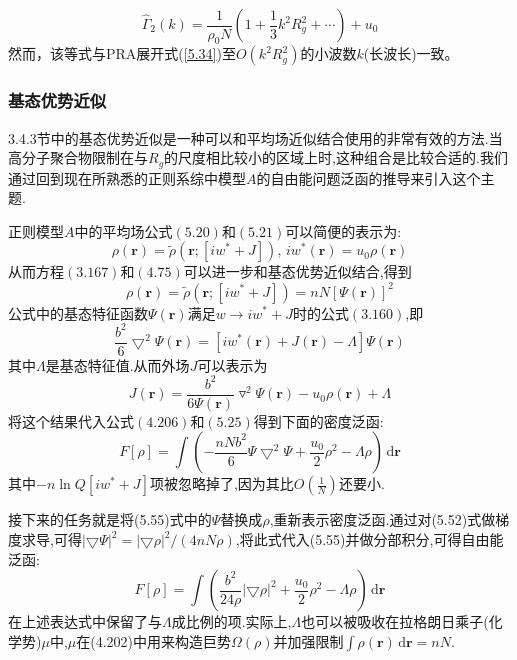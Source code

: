 \begin{equation}
\hat{\Gamma}_2(k)=\frac{1}{\rho_0N}\left(1+\frac{1}{3}k^2R_g^2+\cdots\right)+u_0
\end{equation}
然而，该等式与PRA展开式(\ref{5.34})至$O(k^2R_g^2)$的小波数$k$(长波长)一致。

\subsubsection{基态优势近似}
3.4.3节中的基态优势近似是一种可以和平均场近似结合使用的非常有效的方法.当高分子聚合物限制在与$R_g$的尺度相比较小的区域上时,这种组合是比较合适的.我们通过回到现在所熟悉的正则系综中模型$A$的自由能问题泛函的推导来引入这个主题.

正则模型$A$中的平均场公式$(5.20)$和$(5.21)$可以简便的表示为:
\begin{equation}
\rho(\mathbf{r}) = \tilde{\rho}(\mathbf{r};[iw^*+J]),\,iw^*(\mathbf{r}) = u_0 \rho(\mathbf{r})
\end{equation}
从而方程$(3.167)$和$(4.75)$可以进一步和基态优势近似结合,得到
\begin{equation}
\rho(\mathbf{r}) = \tilde{\rho}(\mathbf{r};[iw^*+J]) = nN[\Psi(\mathbf{r})]^2
\end{equation}
公式中的基态特征函数$\Psi(\mathbf{r})$满足$w \rightarrow iw^*+J$时的公式$(3.160)$,即
\begin{equation}
\frac{b^2}{6} {\bigtriangledown}^2 \Psi(\mathbf{r}) = [iw^*(\mathbf{r})+J(\mathbf{r})-\Lambda]\Psi(\mathbf{r})
\end{equation}
其中$\Lambda$是基态特征值.从而外场$J$可以表示为
\begin{equation}
J(\mathbf{r}) = \frac{b^2}{6 \Psi(\mathbf{r})} \triangledown^2 \Psi(\mathbf{r}) - u_0 \rho(\mathbf{r}) + \Lambda
\end{equation}
将这个结果代入公式$(4.206)$和$(5.25)$得到下面的密度泛函:
\begin{equation}
F[\rho] = \int (-\frac{nNb^2}{6}\Psi\bigtriangledown^2\Psi+\frac{u_0}{2}\rho^2-\Lambda\rho)\,\mathrm{d}\mathbf{r}
\end{equation}
其中$-n\ln Q[iw^*+J]$项被忽略掉了,因为其比$O(\frac{1}{N})$还要小.

接下来的任务就是将(5.55)式中的$\Psi$替换成$\rho$,重新表示密度泛函.通过对(5.52)式做梯度求导,可得$|\bigtriangledown\Psi|^2 = |\bigtriangledown\rho|^2/(4nN\rho)$,将此式代入(5.55)并做分部积分,可得自由能泛函:
\begin{equation}
F[\rho] = \int (\frac{b^2}{24\rho}|\bigtriangledown\rho|^2+\frac{u_0}{2}\rho^2-\Lambda\rho)\,\mathrm{d}\mathbf{r}
\end{equation}
在上述表达式中保留了与$\Lambda$成比例的项.实际上,$\Lambda$也可以被吸收在拉格朗日乘子(化学势)$\mu$中,$\mu$在(4.202)中用来构造巨势$\Omega(\rho)$并加强限制$\int \rho(\mathbf{r})\,\mathrm{d}\mathbf{r}=nN$.


